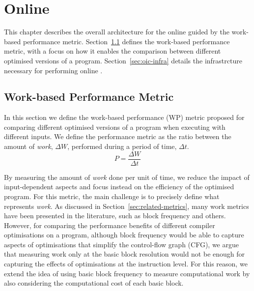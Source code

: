 
\chapter{Online {\IterComp}}\label{chap:oic}

This chapter describes the overall architecture for the online {\itercomp} guided by the work-based performance metric.
Section~\ref{sec:metric} defines the work-based performance metric, with a focus on how it enables the comparison between different optimised versions of a program.
Section~\ref{sec:oic-infra} details the infrastrcture necessary for performing online {\itercomp}.

\section{Work-based Performance Metric}\label{sec:metric}

In this section we define the work-based performance (WP) metric proposed for comparing different optimised versions of a program when executing with different inputs.
We define the performance metric as the ratio between the amount of \textit{work}, $\Delta W$, performed during a period of time, $\Delta t$.
\[
   P = \frac{\Delta W}{\Delta t}
\]

By measuring the amount of \textit{work} done per unit of time, we reduce the impact of input-dependent aspects and focus instead on the efficiency of the optimised program.
For this metric, the main challenge is to precisely define what represents \textit{work}.
As discussed in Section~\ref{sec:related-metrics}, many work metrics have been presented in the literature, such as block frequency and others.
However, for comparing the performance benefits of different compiler optimisations on a program, although block frequency would be able to capture aspects of optimisations that simplify the control-flow graph (CFG), we argue that measuring work only at the basic block resolution would not be enough for capturing the effects of optimisations at the instruction level.
For this reason, we extend the idea of using basic block frequency to measure computational work by also considering the computational cost of each basic block.

